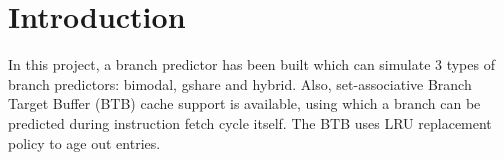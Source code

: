 \section{Introduction}
In this project, a branch predictor has been built which can simulate 3 types of branch predictors: bimodal, gshare and hybrid. Also, set-associative Branch Target Buffer (BTB) cache support is available, using which a branch can be predicted during instruction fetch cycle itself. The BTB uses LRU replacement policy to age out entries.
